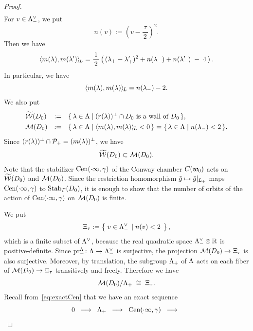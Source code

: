\documentclass{amsart} %
\begin{document}
\begin{proof}
\begin{equation}
\begin{array}{lll}
\end{array}
\end{equation}
%
For $v\in \Lambda_{-}^{\vee}$,
we put
\[
n(v):=\left(v-\dfrac{\,\tau\,}{2}\right)^2.
\]
Then we have
%
\begin{equation}\label{eq:mlmlsprime}
 \langle m(\lambda), m(\lambda^{\prime}) \rangle_{\hskip -1pt L} =\frac{1}{\,2\,}
 \left(\,
({\lambda}_{+} - {\lambda}_{+}^{\prime} )^2
+
n({\lambda}_{-})
+
n({\lambda}_{-}^{\prime})
\;-\;4 
\,\right).
\end{equation}
%
In particular, we have 
%
\[
\langle m(\lambda), m(\lambda) \rangle_{\hskip -1pt L}=n({\lambda}_{-})-2.
\]
%
We also put 
\[
\renewcommand{\arraystretch}{1.3}
\begin{array}{lll}
\tilwalls(D_0) &:= & \set{\lambda\in \Leech}{\textrm{$(\LeechRoot{\lambda})\sperp \cap D_0$ is a wall of $D_0$}}, \\
\MMM(D_0) &:=& \set{\lambda\in \Leech}{\intfL{m(\lambda), m(\lambda)}<0}=\set{\lambda\in \Leech}{n(\lambdaminus)<2}.
\end{array}
\]
Since $(r(\lambda))^{\perp}\cap \mathord{\mathcal{P}}_{+}=(m(\lambda) )^{\perp}$,
we have 
%
\begin{equation}\label{eq:tilWWWMMM}
\widetilde{\mathord{\mathcal{W}}}(D_0)\subset \mathord{\mathcal{M}}(D_0).
\end{equation}
%
Note that the stabilizer $\mathrm{Cen}(\cdot \infty, \gamma)$ of the Conway chamber $\mathord{C}(\boldsymbol{w}_0)$
acts on 
$\widetilde{\mathord{\mathcal{W}}}(D_0)$ and $\mathord{\mathcal{M}}(D_0)$.
Since the restriction homomorphism $\tilde{g}\mapsto \tilde{g}|_{L_{+}}$ maps $\mathrm{Cen}(\cdot \infty, \gamma)$ to $\operatorname{Stab}_{\varGamma}(D_0)$, 
it is enough to show that 
 the number of orbits of the action of $\mathrm{Cen}(\cdot \infty, \gamma)$ on $ \mathord{\mathcal{M}}(D_0)$
is finite.
\par
We put
%
\begin{equation}\label{eq:Xi}
\Xi_{\tau}:=\left\{\; {v\in \Lambda_{-}^{\vee} } \; \left\vert \; {n(v)<2} \; \right.\right \},
\end{equation}
%
which is a finite subset of $\Lambda^{\vee}$, because 
the real quadratic space 
$ \Lambda_{-}^{\vee}\otimes \mathord{\mathbb{R}}$ is positive-definite.
Since $\operatorname{pr}^{\Lambda}_{-}\colon \Lambda \to \Lambda_{-}^{\vee}$ is surjective,
the projection $\mathord{\mathcal{M}}(D_0) \to \Xi_{\tau}$ is also surjective.
Moreover, by translation,
the subgroup $\Lambda_{+}$ of $\Lambda$ acts on each fiber of $\mathord{\mathcal{M}}(D_0) \to \Xi_{\tau}$ 
transitively and freely.
Therefore we have 
\[
\mathord{\mathcal{M}}(D_0)/\Lambda_{+} \;\cong \; \Xi_{\tau}. 
\]
Recall from~\eqref{eq:exactCen} that
we have an exact sequence
%
\begin{equation}\label{eq:exactCenagain}
0\;\;\longrightarrow\;\;\Leechplus\;\; \longrightarrow \;\; 
\Cen(\dotinf, \gamma)
\;\; \longrightarrow \;\; 

\end{equation}
\end{proof}
\end{document}
